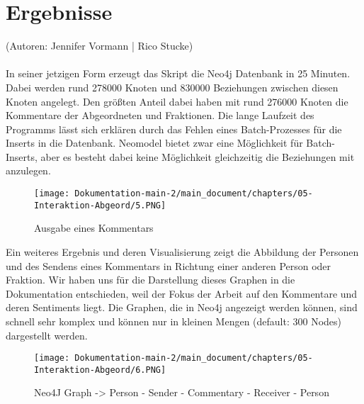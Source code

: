 \section{Ergebnisse}\label{sec:04_04_ergebnisse}
(Autoren: Jennifer Vormann | Rico Stucke)\\
\\
In seiner jetzigen Form erzeugt das Skript die Neo4j Datenbank in 25 Minuten. Dabei werden rund 278000 Knoten und 830000 Beziehungen zwischen diesen Knoten angelegt. Den größten Anteil dabei haben mit rund 276000 Knoten die Kommentare der Abgeordneten und Fraktionen. Die lange Laufzeit des Programms lässt sich erklären durch das Fehlen eines Batch-Prozesses für die Inserts in die Datenbank. Neomodel bietet zwar eine Möglichkeit für Batch-Inserts, aber es besteht dabei keine Möglichkeit gleichzeitig die Beziehungen mit anzulegen.\\
\begin{figure}[htb]
    \centering
    \texttt{[image: Dokumentation-main-2/main\_document/chapters/05-Interaktion-Abgeord/5.PNG]} 
    \caption{Ausgabe eines Kommentars}
    \label{fig:commentary}
\end{figure}
Ein weiteres Ergebnis und deren Visualisierung zeigt die Abbildung der Personen und des Sendens eines Kommentars in Richtung einer anderen Person oder Fraktion. Wir haben uns für die Darstellung dieses Graphen in die Dokumentation entschieden, weil der Fokus der Arbeit auf den Kommentare und deren Sentiments liegt. Die Graphen, die in Neo4j angezeigt werden können, sind schnell sehr komplex und können nur in kleinen Mengen (default: 300 Nodes) dargestellt werden.
\begin{figure}[htb]
    \centering
    \texttt{[image: Dokumentation-main-2/main\_document/chapters/05-Interaktion-Abgeord/6.PNG]} 
    \caption{Neo4J Graph -> Person - Sender - Commentary - Receiver - Person}
    \label{fig:personcomment}
\end{figure}
